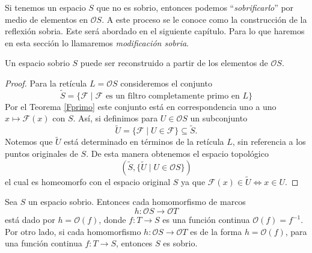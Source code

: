 Si tenemos un espacio $S$ que no es sobrio, entonces podemos ``\emph{sobrificarlo}'' por medio de elementos en $\mathcal{O}S$. A este proceso se le conoce como la construcción de la reflexión sobria. Este será abordado en el siguiente capítulo. Para lo que haremos en esta sección lo llamaremos \emph{modificación sobria}.

\begin{cor}\label{Modsobria}
    Un espacio sobrio $S$ puede ser reconstruido a partir de los elementos de $\mathcal{O}S$.  
\end{cor}

\begin{proof}
    Para la retícula $L=\mathcal{O}S$ consideremos el conjunto 
    \[
    \tilde{S}=\{\mathcal{F}\mid \mathcal{F}\mbox{ es un filtro completamente primo en }L\}
    \]
    Por el Teorema \ref{Fprimo} este conjunto está en correspondencia uno a uno $x\mapsto \mathcal{F}(x)$ con $S$. Así, si definimos para $U\in \mathcal{O}S$ un subconjunto 
    \[
    \tilde{U}=\{\mathcal{F}\mid U\in\mathcal{F}\}\subseteq \tilde{S}.
    \]
    Notemos que $\tilde{U}$ está determinado en términos de la retícula $L$, sin referencia a los puntos originales de $S$. De esta manera obtenemos el espacio topológico 
    \[
    (\tilde{S},\{\tilde{U}\mid U\in\mathcal{O}S\})
    \]
    el cual es homeomorfo con el espacio original $S$ ya que $\mathcal{F}(x)\in \tilde{U}\Leftrightarrow x\in U$.
\end{proof}

\begin{thm}
    Sea $S$ un espacio sobrio. Entonces cada homomorfismo de marcos 
    \[
    h\colon \mathcal{O}S\to \mathcal{O}T
    \]
    está dado por $h=\mathcal{O}(f)$, donde $f\colon T\to S$ es una función continua $\mathcal{O}(f)=f^{-1}$. Por otro lado, si cada homomorfismo $h\colon \mathcal{O}S\to \mathcal{O}T$ es de la forma $h=\mathcal{O}(f)$, para una función  continua $f\colon T\to S$, entonces $S$ es sobrio.
\end{thm}

